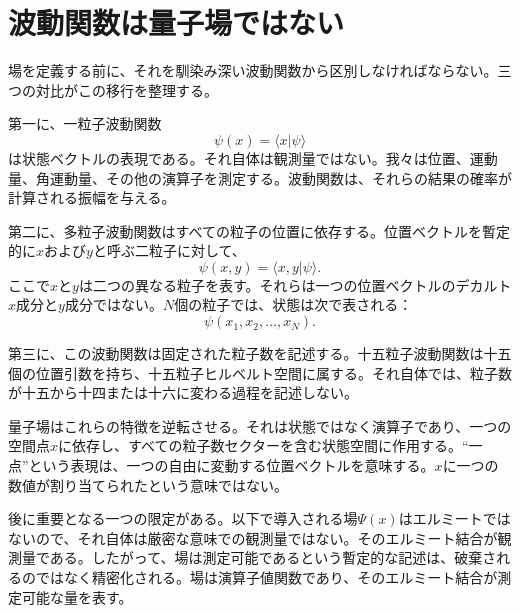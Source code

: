 \section{波動関数は量子場ではない}

場を定義する前に、それを馴染み深い波動関数から区別しなければならない。三つの対比がこの移行を整理する。

第一に、一粒子波動関数
\begin{equation}
\psi(x)=\langle x|\psi\rangle
\end{equation}
は状態ベクトルの表現である。それ自体は観測量ではない。我々は位置、運動量、角運動量、その他の演算子を測定する。波動関数は、それらの結果の確率が計算される振幅を与える。

第二に、多粒子波動関数はすべての粒子の位置に依存する。位置ベクトルを暫定的に\(x\)および\(y\)と呼ぶ二粒子に対して、
\begin{equation}
\psi(x,y)=\langle x,y|\psi\rangle.
\end{equation}
ここで\(x\)と\(y\)は二つの異なる粒子を表す。それらは一つの位置ベクトルのデカルト\(x\)成分と\(y\)成分ではない。\(N\)個の粒子では、状態は次で表される：
\begin{equation}
\psi(x_1,x_2,\ldots,x_N).
\end{equation}

第三に、この波動関数は固定された粒子数を記述する。十五粒子波動関数は十五個の位置引数を持ち、十五粒子ヒルベルト空間に属する。それ自体では、粒子数が十五から十四または十六に変わる過程を記述しない。

量子場はこれらの特徴を逆転させる。それは状態ではなく演算子であり、一つの空間点\(x\)に依存し、すべての粒子数セクターを含む状態空間に作用する。``一点''という表現は、一つの自由に変動する位置ベクトルを意味する。\(x\)に一つの数値が割り当てられたという意味ではない。

後に重要となる一つの限定がある。以下で導入される場\(\Psi(x)\)はエルミートではないので、それ自体は厳密な意味での観測量ではない。そのエルミート結合が観測量である。したがって、場は測定可能であるという暫定的な記述は、破棄されるのではなく精密化される。場は演算子値関数であり、そのエルミート結合が測定可能な量を表す。

\begin{classroomqa}
\end{classroomqa}

